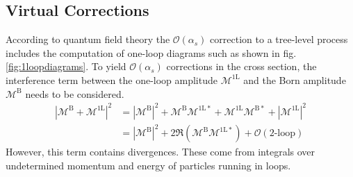 \subsection{Virtual Corrections}
According to quantum field theory the $\mathcal{O}(\alpha_s)$ correction to a tree-level process includes the computation of one-loop diagrams such as shown in fig. \ref{fig:1loopdiagrams}. To yield $\mathcal{O}(\alpha_s)$ corrections in the cross section, the interference term between the one-loop amplitude $\mathcal{M}^{\mathrm{1L}}$ and the Born amplitude $\mathcal{M}^{\mathrm{B}}$ needs to be considered. 
\begin{align}
\left| \mathcal{M}^{\mathrm{B}} + \mathcal{M}^{\mathrm{1L}} \right|^2 &= \left| \mathcal{M}^{\mathrm{B}} \right|^2 + \mathcal{M}^{\mathrm{B}} \mathcal{M}^{\mathrm{1L}\ast} + \mathcal{M}^{\mathrm{1L}} \mathcal{M}^{\mathrm{B}\ast} + \left| \mathcal{M}^{\mathrm{1L}} \right|^2\nonumber\\
&= \left| \mathcal{M}^{\mathrm{B}} \right|^2 + 2 \Re \left( \mathcal{M}^{\mathrm{B}} \mathcal{M}^{\mathrm{1L}\ast} \right) + \mathcal{O}(\mbox{2-loop})
\end{align}
However, this term contains divergences. These come from integrals over undetermined momentum and energy of particles running in loops.
